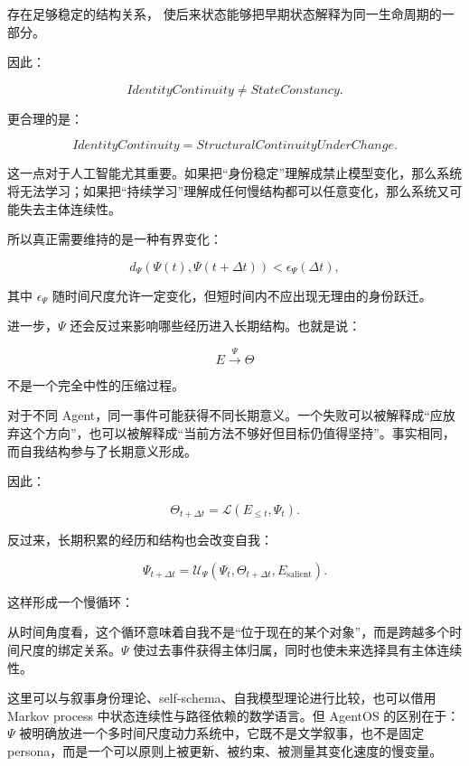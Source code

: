 \begin{statementbox}
存在足够稳定的结构关系，
使后来状态能够把早期状态解释为同一生命周期的一部分。
\end{statementbox}

因此：

\[
IdentityContinuity
\neq
StateConstancy.
\]

更合理的是：

\[
\boxed{
IdentityContinuity
=
StructuralContinuityUnderChange.
}
\]

这一点对于人工智能尤其重要。如果把“身份稳定”理解成禁止模型变化，那么系统将无法学习；如果把“持续学习”理解成任何慢结构都可以任意变化，那么系统又可能失去主体连续性。

所以真正需要维持的是一种有界变化：

\[
d_{\Psi}
\left(
\Psi(t),
\Psi(t+\Delta t)
\right)
<
\epsilon_{\Psi}(\Delta t),
\]

其中 $\epsilon_{\Psi}$ 随时间尺度允许一定变化，但短时间内不应出现无理由的身份跃迁。

进一步，$\Psi$ 还会反过来影响哪些经历进入长期结构。也就是说：

\[
E
\xrightarrow{\Psi}
\Theta
\]

不是一个完全中性的压缩过程。

对于不同 Agent，同一事件可能获得不同长期意义。一个失败可以被解释成“应放弃这个方向”，也可以被解释成“当前方法不够好但目标仍值得坚持”。事实相同，而自我结构参与了长期意义形成。

因此：

\[
\Theta_{t+\Delta t}
=
\mathcal{L}
\left(
E_{\leq t},
\Psi_t
\right).
\]

反过来，长期积累的经历和结构也会改变自我：

\[
\Psi_{t+\Delta t}
=
\mathcal{U}_{\Psi}
\left(
\Psi_t,
\Theta_{t+\Delta t},
E_{\mathrm{salient}}
\right).
\]

这样形成一个慢循环：

\begin{statementbox}
\centering
{}
\end{statementbox}

从时间角度看，这个循环意味着自我不是“位于现在的某个对象”，而是跨越多个时间尺度的绑定关系。$\Psi$ 使过去事件获得主体归属，同时也使未来选择具有主体连续性。

这里可以与叙事身份理论、self-schema、自我模型理论进行比较，也可以借用 Markov process 中状态连续性与路径依赖的数学语言。但 AgentOS 的区别在于：$\Psi$ 被明确放进一个多时间尺度动力系统中，它既不是文学叙事，也不是固定 persona，而是一个可以原则上被更新、被约束、被测量其变化速度的慢变量。

